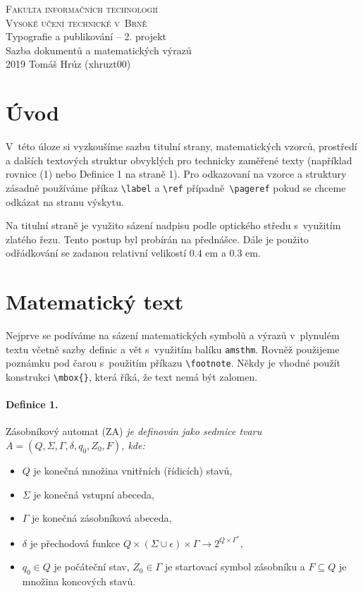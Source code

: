 \documentclass[a4paper,11pt,twocolumn]{article}
\begin{document}
\begin{titlepage}
\begin{center}
\textsc{\Huge Fakulta informačních technologií\\
Vysoké učení technické v~Brně}\\
\LARGE Typografie a publikování -- 2. projekt\\
Sazba dokumentů a matematických výrazů\\
\Large 2019 \hfill         Tomáš Hrúz (xhruzt00)
\newpage
\end{center}
\end{titlepage}

\section*{Úvod}
V~této úloze si vyzkoušíme sazbu titulní strany, matematických vzorců, prostředí a dalších textových struktur obvyklých pro technicky zaměřené texty (například rovnice (1)
nebo Definice 1 na straně 1). Pro odkazovaní na vzorce
a struktury zásadně používáme příkaz \verb/\label/ a \verb/\ref/
případně\verb/ \pageref/ pokud se chceme odkázat na stranu
výskytu.

\par Na titulní straně je využito sázení nadpisu podle optického středu s~využitím zlatého řezu. Tento postup byl
probírán na přednášce. Dále je použito odřádkování se
zadanou relativní velikostí 0.4 em a 0.3 em.

\section{Matematický text}
Nejprve se podíváme na sázení matematických symbolů
a výrazů v~plynulém textu včetně sazby definic a vět s~využitím balíku \verb/amsthm/. Rovněž použijeme poznámku pod
čarou s~použitím příkazu \verb/\footnote/. Někdy je vhodné
použít konstrukci \verb/\mbox{}/, která říká, že text nemá být
zalomen.
\paragraph{Definice 1.}Zásobníkový automat (ZA) \emph{je definován jako
sedmice tvaru $A = (Q, \Sigma, \Gamma, \delta, q_0, Z_0, F)$, kde:}

\begin{itemize}
\item $Q$ je konečná množina vnitřních (řídicích) stavů,
\item $\Sigma$ je konečná vstupní abeceda,
\item $\Gamma$ je konečná zásobníková abeceda,
\item {$\delta$ je přechodová funkce $Q \times (\Sigma \cup {\epsilon}) \times \Gamma \rightarrow 2^{Q\times\Gamma^*},$}
\item $q_0 \in Q$ je počáteční stav, $Z_0 \in \Gamma$ je startovací symbol zásobníku a $F \subseteq Q$ je množina koncových stavů.
\end{itemize}
\end{document}
